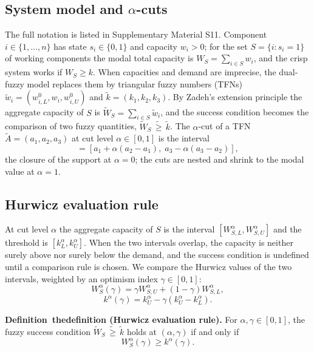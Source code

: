 \documentclass[Review,sagev,times]{sagej}%
\newcommand{\stmt}[3]{\refstepcounter{#1}\label{#2}#3~\csname the#1\endcsname}
\newcommand{\kag}{k^{\alpha}(\gamma)}\newcommand{\WS}{\tilde{W}_S}\newcommand{\Zsuf}{Z^{\mathrm{suf}}}
\begin{document}
\subsection{System model and $\alpha$-cuts}
The full notation is listed in Supplementary Material S11. Component $i\in\{1,\dots,n\}$ has state $s_i\in\{0,1\}$
and capacity $w_i>0$; for the set $S=\{i:s_i=1\}$ of working components the modal total capacity is
$W_S=\sum_{i\in S}w_i$, and the crisp system works if $W_S\ge k$. When capacities and demand are imprecise, the
dual-fuzzy model replaces them by triangular fuzzy numbers (TFNs) $\tilde{w}_i=(w_{i,L}^0,w_i,w_{i,U}^0)$ and
$\tilde{k}=(k_1,k_2,k_3)$. By Zadeh's extension principle the aggregate capacity of $S$ is
$\WS=\sum_{i\in S}\tilde{w}_i$, and the success condition becomes the comparison of two fuzzy quantities,
$\WS\,\tilde{\geq}\,\tilde{k}$. The $\alpha$-cut of a TFN $\tilde{A}=(a_1,a_2,a_3)$ at cut level $\alpha\in[0,1]$
is the interval
\begin{equation}
[A_L^\alpha, A_U^\alpha] = [a_1 + \alpha(a_2 - a_1),\; a_3 - \alpha(a_3 - a_2)],
\label{eq:tfn_cut}
\end{equation}
the closure of the support at $\alpha=0$; the cuts are nested and shrink to the modal value at $\alpha=1$.

\subsection{Hurwicz evaluation rule} \label{sec:hurwicz}
At cut level $\alpha$ the aggregate capacity of $S$ is the interval $[W_{S,L}^\alpha,W_{S,U}^\alpha]$ and the
threshold is $[k_L^\alpha,k_U^\alpha]$. When the two intervals overlap, the capacity is neither surely above nor
surely below the demand, and the success condition is undefined until a comparison rule is chosen. We compare
the Hurwicz values of the two intervals\cite{Hurwicz1951}, weighted by an optimism index $\gamma\in[0,1]$:
\begin{equation}
W_S^\alpha(\gamma) = \gamma W_{S,U}^\alpha + (1-\gamma) W_{S,L}^\alpha,
\label{eq:hurwicz_w}
\end{equation}
\begin{equation}
\kag = k_U^\alpha - \gamma (k_U^\alpha - k_L^\alpha).
\label{eq:hurwicz_k}
\end{equation}

\textbf{\stmt{definition}{def:hurwicz}{Definition} (Hurwicz evaluation rule).}
For $\alpha,\gamma\in[0,1]$, the fuzzy success condition $\WS\,\tilde{\geq}\,\tilde{k}$ holds at $(\alpha,\gamma)$
if and only if
\begin{equation}
W_S^\alpha(\gamma) \geq \kag.
\label{eq:success}
\end{equation}
\end{document}
